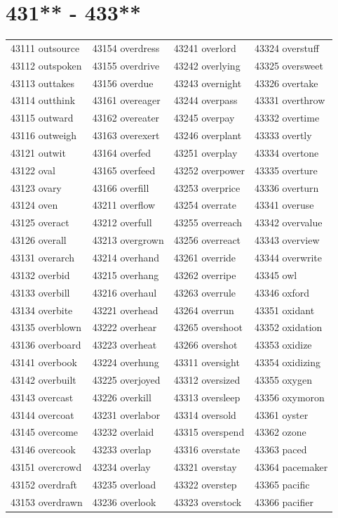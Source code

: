\documentclass[10pt, oneside]{book}
\begin{document}
\begin{table}
	\centering
	\section*{431** - 433**}
	\begin{tabular}{l l l l}
43111 outsource &43154 overdress &43241 overlord &43324 overstuff\\
43112 outspoken &43155 overdrive &43242 overlying &43325 oversweet\\
43113 outtakes &43156 overdue &43243 overnight &43326 overtake\\
43114 outthink &43161 overeager &43244 overpass &43331 overthrow\\
43115 outward &43162 overeater &43245 overpay &43332 overtime\\
43116 outweigh &43163 overexert &43246 overplant &43333 overtly\\
43121 outwit &43164 overfed &43251 overplay &43334 overtone\\
43122 oval &43165 overfeed &43252 overpower &43335 overture\\
43123 ovary &43166 overfill &43253 overprice &43336 overturn\\
43124 oven &43211 overflow &43254 overrate &43341 overuse\\
43125 overact &43212 overfull &43255 overreach &43342 overvalue\\
43126 overall &43213 overgrown &43256 overreact &43343 overview\\
43131 overarch &43214 overhand &43261 override &43344 overwrite\\
43132 overbid &43215 overhang &43262 overripe &43345 owl\\
43133 overbill &43216 overhaul &43263 overrule &43346 oxford\\
43134 overbite &43221 overhead &43264 overrun &43351 oxidant\\
43135 overblown &43222 overhear &43265 overshoot &43352 oxidation\\
43136 overboard &43223 overheat &43266 overshot &43353 oxidize\\
43141 overbook &43224 overhung &43311 oversight &43354 oxidizing\\
43142 overbuilt &43225 overjoyed &43312 oversized &43355 oxygen\\
43143 overcast &43226 overkill &43313 oversleep &43356 oxymoron\\
43144 overcoat &43231 overlabor &43314 oversold &43361 oyster\\
43145 overcome &43232 overlaid &43315 overspend &43362 ozone\\
43146 overcook &43233 overlap &43316 overstate &43363 paced\\
43151 overcrowd &43234 overlay &43321 overstay &43364 pacemaker\\
43152 overdraft &43235 overload &43322 overstep &43365 pacific\\
43153 overdrawn &43236 overlook &43323 overstock &43366 pacifier\\
	\end{tabular}
 \end{table}
\clearpage
\end{document}

